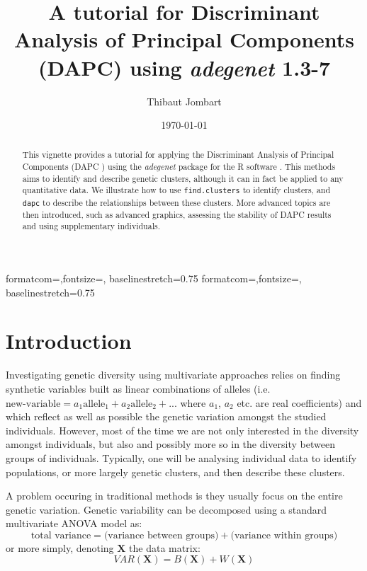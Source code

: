\documentclass{article}
\title{A tutorial for Discriminant Analysis of Principal Components (DAPC) using \textit{adegenet} 1.3-7}
\author{Thibaut Jombart}
\date{\today}
\newcommand{\m}[1]{\mathbf{#1}}
\newcommand{\code}[1]{{{\tt #1}}}
\begin{document}
{formatcom={\color{Sinput}},fontsize=\footnotesize, baselinestretch=0.75}
{formatcom={\color{Soutput}},fontsize=\footnotesize, baselinestretch=0.75}

\color{black}

\maketitle

\begin{abstract}
  This vignette provides a tutorial for applying the Discriminant Analysis of Principal Components
  (DAPC \cite{tjart19}) using the \textit{adegenet} package \cite{tjart05} for the R software
  \cite{np145}. This methods aims to identify and describe genetic clusters, although it can in fact
  be applied to any quantitative data. We illustrate how to use \code{find.clusters} to identify
  clusters, and \code{dapc} to describe the relationships between these clusters. More advanced
  topics are then introduced, such as advanced graphics, assessing the stability of DAPC results and
  using supplementary individuals.
\end{abstract}


\newpage
\tableofcontents


\newpage
\section{Introduction}


Investigating genetic diversity using multivariate approaches relies on finding synthetic variables
built as linear combinations of alleles (i.e. $\mbox{new-variable} = a_1 \mbox{allele}_1 + a_2 \mbox{allele}_2 + ... $
where $a_1$, $a_2$ etc. are real coefficients)
and which reflect as well as possible the genetic variation amongst the studied individuals.
However, most of the time we are not only interested in the diversity amongst individuals, but
also and possibly more so in the diversity between groups of individuals.
Typically, one will be analysing individual data to identify populations, or more largely genetic
clusters, and then describe these clusters.

A problem occuring in traditional methods is they usually focus on the entire genetic variation.
Genetic variability can be decomposed using a standard multivariate ANOVA model as:
$$
\mbox{total variance} = \mbox{(variance between groups)} + \mbox{(variance within groups)}
$$
or more simply, denoting $\m{X}$ the data matrix:
$$
VAR(\m{X}) = B(\m{X}) + W(\m{X})
$$
\end{document}
